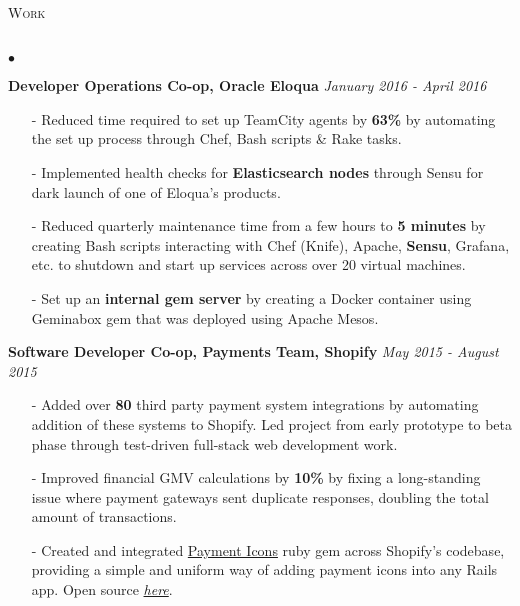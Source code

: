 \documentclass[11pt]{article}
\newcommand{\lineunder}{\vspace*{-8pt} \\ \hspace*{-18pt} \hrulefill \\}
\newcommand{\header}[1]{{\hspace*{-15pt}\vspace*{6pt} \textsc{#1}} \vspace*{-6pt} \lineunder }
\newenvironment{achievements}{\begin{list}{$\bullet$}{\topsep 0pt \itemsep -1.5pt \leftmargin 5pt}}{\vspace*{4pt}\end{list}}
\begin{document}
\header{\fontsize{11.1}{10}\selectfont Work}
\begin{achievements}
\item \textbf{{\fontsize{9.5}{10}\selectfont  Developer Operations Co-op, Oracle Eloqua}} \hfill \textit {January 2016 - April 2016}
\begin{itemize}
\item[-]Reduced time required to set up TeamCity agents by \textbf{63\%} by automating the set up process through Chef, Bash scripts \& Rake tasks.
\vspace{2pt}
\item[-]Implemented health checks for \textbf{Elasticsearch nodes} through Sensu for dark launch of one of Eloqua's products.
\vspace{2pt}
\item[-]Reduced quarterly maintenance time from a few hours to \textbf{5 minutes} by creating Bash scripts interacting with Chef (Knife), Apache, \textbf{Sensu}, Grafana, etc. to shutdown and start up services across over 20 virtual machines.
\vspace{2pt}
\item[-]Set up an \textbf{internal gem server} by creating a Docker container using Geminabox gem that was deployed using Apache Mesos.
\end{itemize}
\vspace{4pt}
\item \textbf{{\fontsize{9.5}{10}\selectfont Software Developer Co-op, Payments Team, Shopify}} \hfill \textit {May 2015 - August 2015}
\begin{itemize}
\item[-]Added over \textbf{80} third party payment system integrations by automating addition of these systems to Shopify. Led project from early prototype to beta phase through test-driven full-stack web development work.
\vspace{2pt}
\item[-]Improved financial GMV calculations by \textbf{10\%} by fixing a long-standing issue where payment gateways sent duplicate responses, doubling the total amount of transactions. 
\vspace{2pt}
\item[-]Created and integrated \href{https://github.com/activemerchant/payment_icons}{Payment Icons} ruby gem across Shopify's codebase, providing a simple and uniform way of adding payment icons into any Rails app. Open source \href{https://github.com/activemerchant/payment_icons}{\textit{here}}.
\end{itemize}
\end{achievements}
\end{document}
